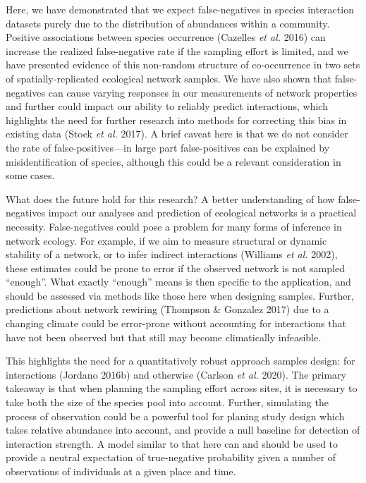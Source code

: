 \documentclass[11pt]{article}
\begin{document}
Here, we have demonstrated that we expect false-negatives in species
interaction datasets purely due to the distribution of abundances within
a community. Positive associations between species occurrence (Cazelles
\emph{et al.} 2016) can increase the realized false-negative rate if the
sampling effort is limited, and we have presented evidence of this
non-random structure of co-occurrence in two sets of
spatially-replicated ecological network samples. We have also shown that
false-negatives can cause varying responses in our measurements of
network properties and further could impact our ability to reliably
predict interactions, which highlights the need for further research
into methods for correcting this bias in existing data (Stock \emph{et
al.} 2017). A brief caveat here is that we do not consider the rate of
false-positives---in large part false-positives can be explained by
misidentification of species, although this could be a relevant
consideration in some cases.

What does the future hold for this research? A better understanding of
how false-negatives impact our analyses and prediction of ecological
networks is a practical necessity. False-negatives could pose a problem
for many forms of inference in network ecology. For example, if we aim
to measure structural or dynamic stability of a network, or to infer
indirect interactions (Williams \emph{et al.} 2002), these estimates
could be prone to error if the observed network is not sampled
``enough''. What exactly ``enough'' means is then specific to the
application, and should be assessed via methods like those here when
designing samples. Further, predictions about network rewiring (Thompson
\& Gonzalez 2017) due to a changing climate could be error-prone without
accounting for interactions that have not been observed but that still
may become climatically infeasible.

This highlights the need for a quantitatively robust approach samples
design: for interactions (Jordano 2016b) and otherwise (Carlson \emph{et
al.} 2020). The primary takeaway is that when planning the sampling
effort across sites, it is necessary to take both the size of the
species pool into account. Further, simulating the process of
observation could be a powerful tool for planing study design which
takes relative abundance into account, and provide a null baseline for
detection of interaction strength. A model similar to that here can and
should be used to provide a neutral expectation of true-negative
probability given a number of observations of individuals at a given
place and time.
\end{document}
